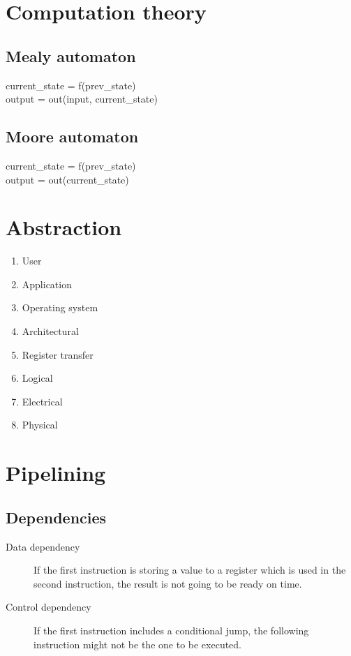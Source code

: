 \documentclass[a4paper,twocolumn]{article}
\begin{document}
\section{Computation theory}

\subsection{Mealy automaton}

current\_state = f(prev\_state) \\
output = out(input, current\_state)

\subsection{Moore automaton}

current\_state = f(prev\_state) \\
output = out(current\_state)

\section{Abstraction}

\begin{enumerate}
  \item User
  \item Application
  \item Operating system
  \item Architectural
  \item Register transfer
  \item Logical
  \item Electrical
  \item Physical
\end{enumerate}

\section{Pipelining}

\subsection{Dependencies}

\begin{description}
  \item[Data dependency] If the first instruction is storing a value to a
                         register which is used in the second instruction,
                         the result is not going to be ready on time.
  \item[Control dependency] If the first instruction includes a conditional
                         jump, the following instruction might not be the
                         one to be executed.
\end{description}
\end{document}
